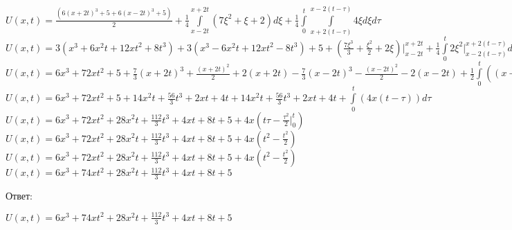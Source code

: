 \documentclass{article}
\begin{document}
    \begin{center}
        $ U(x, t) = \frac{(6 (x + 2t)^3 + 5 + 6 (x - 2t)^3 + 5)}{2} + \frac{1}{4} \int\limits_{x-2t}^{x+2t} (7\xi^2 + \xi + 2) d\xi + \frac{1}{4} \int\limits_{0}^{t}\int\limits_{x+2(t-\tau)}^{x-2(t-\tau)} 4\xi d\xi d\tau $ \\
        $ U(x, t) = 3(x^3+6x^2t + 12xt^2 + 8t^3) + 3(x^3 - 6x^2t + 12xt^2 - 8t^3) + 5 + ( \frac{7\xi^3}{3} + \frac{\xi^2}{2} + 2\xi ) {\Big|}_{x-2t}^{x+2t} + \frac{1}{4} \int\limits_0^t 2\xi^2 \Big|_{x-2(t-\tau)}^{x+2(t-\tau)} d\xi $ \\
        $ U(x, t) = 6 x^3 + 72xt^2 + 5 + \frac{7}{3}(x+2t)^3 + \frac{(x+2t)^2}{2} + 2(x + 2t) - \frac{7}{3}(x-2t)^3 - \frac{(x-2t)^2}{2} - 2(x-2t) + \frac{1}{2}\int\limits_0^t((x + 2(t - \tau))^2 - (x - 2(t - \tau))^2)d\tau $ \\
        $ U(x, t) = 6x^3 + 72xt^2 + 5 + 14x^2t + \frac{56}{3}t^3 + 2xt + 4t + 14x^2t + \frac{56}{3}t^3 + 2xt + 4t + \int\limits_0^t(4x(t - \tau))d\tau $ \\
        $ U(x, t) = 6x^3 + 72xt^2 + 28x^2t + \frac{112}{3}t^3 + 4xt + 8t + 5 + 4x(t\tau - \frac{\tau^2}{2} \Big|_0^t) $ \\
        $ U(x, t) = 6x^3 + 72xt^2 + 28x^2t + \frac{112}{3}t^3 + 4xt + 8t + 5 + 4x(t^2 - \frac{t^2}{2}) $ \\
        $ U(x, t) = 6x^3 + 72xt^2 + 28x^2t + \frac{112}{3}t^3 + 4xt + 8t + 5 + 4x(t^2 - \frac{t^2}{2}) $ \\
        $ U(x, t) = 6x^3 + 74xt^2 + 28x^2t + \frac{112}{3}t^3 + 4xt + 8t + 5  $ \\
    \end{center}
    Ответ:
    \begin{center}
        $ U(x, t) = 6x^3 + 74xt^2 + 28x^2t + \frac{112}{3}t^3 + 4xt + 8t + 5  $ \\
    \end{center}

    \newpage 
\end{document}

